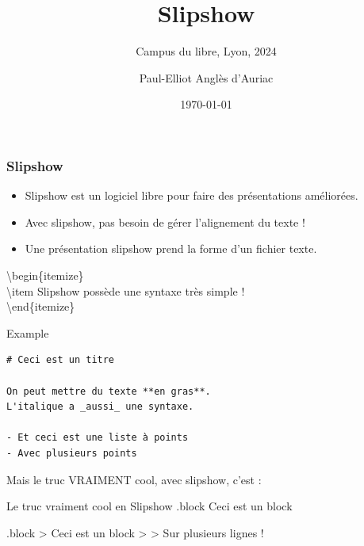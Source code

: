 \documentclass[10pt]{beamer}
\title{Slipshow}
\subtitle{Campus du libre, Lyon, 2024}
\author{Paul-Elliot Anglès d'Auriac}
\date{\today}
\institute{Tarides}
\begin{document}
\begin{frame}
  \titlepage
\end{frame}

\begin{frame}[fragile]
  \frametitle{Slipshow}

  \begin{itemize}
  \item Slipshow est un logiciel libre pour faire des présentations améliorées. \pause
  \item Avec slipshow, pas besoin de gérer l'alignement du texte ! \pause
  \item Une présentation slipshow prend la forme d'un fichier texte.
  \end{itemize}

  \pause

  \vspace{0.25cm}

  \textbackslash begin\{itemize\}\\
  \textbackslash item Slipshow possède une syntaxe très simple !\\
  \textbackslash end\{itemize\}
  \vspace{0.25cm}

  \pause

  \begin{exampleblock}{Example}
    \begin{lstlisting}
# Ceci est un titre

On peut mettre du texte **en gras**.
L'italique a _aussi_ une syntaxe.

- Et ceci est une liste à points
- Avec plusieurs points
    \end{lstlisting}
  \end{exampleblock}

  \pause

  Mais le truc VRAIMENT cool, avec slipshow, c'est :

  \begin{exampleblock}{Le truc vraiment cool en Slipshow}
      {.block}
      Ceci est un block


      {.block}
      > Ceci est un block
      >
      > Sur plusieurs lignes !
  \end{exampleblock}

\end{frame}
\end{document}
